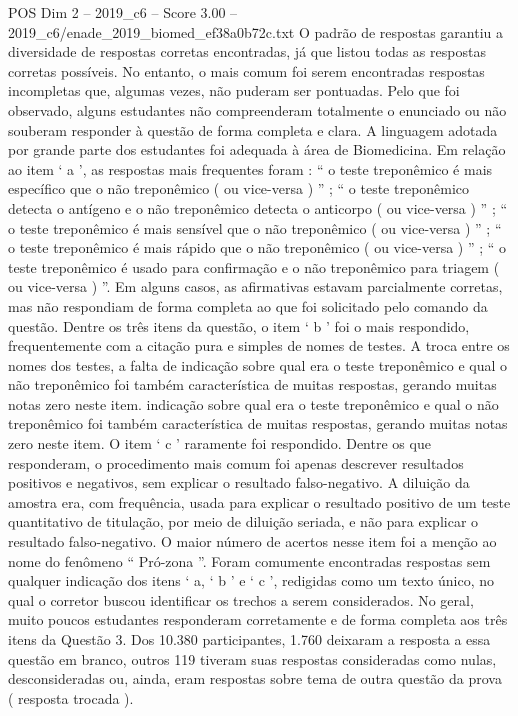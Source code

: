\begin{textsample}{POS Dim 2 – 2019\_c6 – Score 3.00 – 2019\_c6/enade\_2019\_biomed\_ef38a0b72c.txt}
O padrão de respostas garantiu a diversidade de respostas corretas encontradas, já que listou todas as respostas corretas possíveis.
No entanto, o mais comum foi serem encontradas respostas incompletas que, algumas vezes, não puderam ser pontuadas.
Pelo que foi observado, alguns estudantes não compreenderam totalmente o enunciado ou não souberam responder à questão de forma completa e clara.
A linguagem adotada por grande parte dos estudantes foi adequada à área de Biomedicina.
Em relação ao item ‘ a ’, as respostas mais frequentes foram : “ o teste treponêmico é mais específico que o não treponêmico ( ou vice-versa ) ” ; “ o teste treponêmico detecta o antígeno e o não treponêmico detecta o anticorpo ( ou vice-versa ) ” ; “ o teste treponêmico é mais sensível que o não treponêmico ( ou vice-versa ) ” ; “ o teste treponêmico é mais rápido que o não treponêmico ( ou vice-versa ) ” ; “ o teste treponêmico é usado para confirmação e o não treponêmico para triagem ( ou vice-versa ) ”.
Em alguns casos, as afirmativas estavam parcialmente corretas, mas não respondiam de forma completa ao que foi solicitado pelo comando da questão.
Dentre os três itens da questão, o item ‘ b ’ foi o mais respondido, frequentemente com a citação pura e simples de nomes de testes.
A troca entre os nomes dos testes, a falta de indicação sobre qual era o teste treponêmico e qual o não treponêmico foi também característica de muitas respostas, gerando muitas notas zero neste item. indicação sobre qual era o teste treponêmico e qual o não treponêmico foi também característica de muitas respostas, gerando muitas notas zero neste item.
O item ‘ c ’ raramente foi respondido.
Dentre os que responderam, o procedimento mais comum foi apenas descrever resultados positivos e negativos, sem explicar o resultado falso-negativo.
A diluição da amostra era, com frequência, usada para explicar o resultado positivo de um teste quantitativo de titulação, por meio de diluição seriada, e não para explicar o resultado falso-negativo.
O maior número de acertos nesse item foi a menção ao nome do fenômeno “ Pró-zona ”.
Foram comumente encontradas respostas sem qualquer indicação dos itens ‘ a, ‘ b ’ e ‘ c ’, redigidas como um texto único, no qual o corretor buscou identificar os trechos a serem considerados.
No geral, muito poucos estudantes responderam corretamente e de forma completa aos três itens da Questão 3.
Dos 10.380 participantes, 1.760 deixaram a resposta a essa questão em branco, outros 119 tiveram suas respostas consideradas como nulas, desconsideradas ou, ainda, eram respostas sobre tema de outra questão da prova ( resposta trocada ).

\end{textsample}
